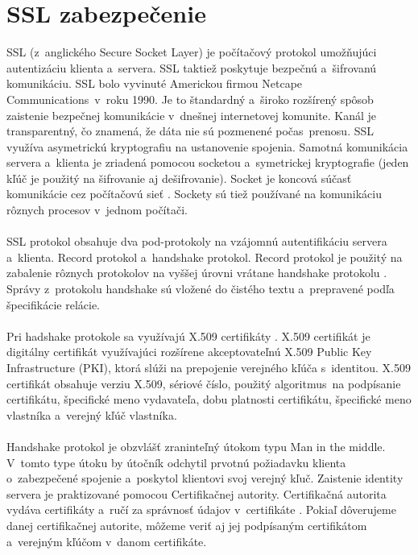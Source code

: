 \documentclass[
  digital, %
  table,   %
oneside,
  nolof,     %
  nolot,     %
]{fithesis3}
\begin{document}
\section{SSL zabezpečenie}
SSL (z~anglického Secure Socket Layer) \cite{ssl}\cite{sslOnline} je počítačový protokol umožňujúci autentizáciu  klienta a~servera. SSL taktiež  poskytuje  bezpečnú a~šifrovanú komunikáciu. SSL bolo vyvinuté Americkou firmou Netcape Communications~v~roku 1990. Je to štandardný a~široko rozšírený spôsob zaistenie bezpečnej komunikácie v~dnešnej internetovej komunite. Kanál je transparentný, čo znamená, že dáta nie sú pozmenené počas~prenosu. SSL využíva asymetrickú kryptografiu  na ustanovenie spojenia. Samotná komunikácia servera a~klienta je zriadená pomocou socketou a~symetrickej kryptografie (jeden kľúč je použitý na šifrovanie aj dešifrovanie). Socket je koncová súčasť komunikácie cez počítačovú sieť \cite{networkSocket}. Sockety sú tiež používané na komunikáciu rôznych procesov v~jednom počítači. \paragraph{}
SSL protokol obsahuje dva pod-protokoly na vzájomnú autentifikáciu servera a~klienta. Record protokol a~handshake protokol. Record protokol je použitý na zabalenie rôznych protokolov na vyššej úrovni vrátane handshake protokolu \cite{ssl3.0}. Správy z~protokolu handshake  sú vložené do čistého textu a~prepravené podľa špecifikácie relácie. \paragraph{}
Pri hadshake protokole sa využívajú X.509 certifikáty \cite{x509cert}. X.509 certifikát je digitálny certifikát využívajúci rozšírene akceptovateľnú X.509 Public Key Infrastructure (PKI), ktorá slúži na prepojenie verejného kľúča s~identitou.  X.509 certifikát obsahuje verziu X.509, sériové číslo, použitý algoritmus~na podpísanie certifikátu, špecifické meno vydavateľa, dobu platnosti certifikátu, špecifické meno vlastníka a~verejný kľúč vlastníka.  
\paragraph{}
Handshake protokol je obzvlášť zraninteľný  útokom typu Man in the middle. V~tomto type útoku by útočník odchytil prvotnú požiadavku klienta o~zabezpečené spojenie a~poskytol klientovi svoj verejný kľuč. Zaistenie identity servera je praktizované pomocou Certifikačnej autority.  Certifikačná autorita vydáva certifikáty a~ručí za správnosť údajov v~certifikáte \cite{certificateAuth}. Pokiaľ dôverujeme danej certifikačnej autorite, môžeme veriť aj jej podpísaným certifikátom  a~verejným kľúčom v~danom certifikáte. 
\end{document}

